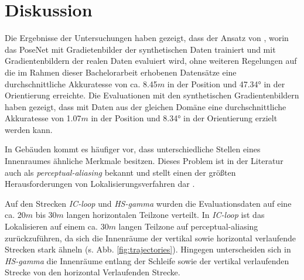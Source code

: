 
\section{Diskussion}
\label{sec:kapitel_5}

Die Ergebnisse der Untersuchungen haben gezeigt, dass der Ansatz von \citet{acharyaBIMPoseNetIndoorCamera2019}, worin das PoseNet mit Gradietenbilder der synthetischen Daten trainiert und mit Gradientenbildern der realen Daten evaluiert wird, ohne weiteren Regelungen auf die im Rahmen dieser Bachelorarbeit erhobenen Datensätze eine durchschnittliche Akkuratesse von ca. 8.45$m$ in der Position und 47.34° in der Orientierung erreichte. Die Evaluationen mit den synthetischen Gradientenbildern haben gezeigt, dass mit Daten aus der gleichen Domäne eine durchschnittliche Akkuratesse von 1.07$m$ in der Position und 8.34° in der Orientierung erzielt werden kann. 


In Gebäuden kommt es häufiger vor, dass unterschiedliche Stellen eines Innenraumes ähnliche Merkmale besitzen. Dieses Problem ist in der Literatur auch als \textit{perceptual-aliasing} bekannt und stellt einen der größten Herausforderungen von Lokalisierungsverfahren dar \cite{lowryVisualPlaceRecognition2016}.

Auf den Strecken \textit{IC-loop} und \textit{HS-gamma} wurden die Evaluationsdaten auf eine ca. 20$m$ bis 30$m$ langen horizontalen Teilzone verteilt. In \textit{IC-loop} ist das Lokalisieren auf einem ca. 30$m$ langen Teilzone auf perceptual-aliasing zurückzuführen, da sich die Innenräume der vertikal sowie horizontal verlaufende Strecken stark ähneln (s. Abb. \ref{fig:trajectories}). Hingegen unterscheiden sich in \textit{HS-gamma} die Innenräume entlang der Schleife sowie der vertikal verlaufenden Strecke von den horizontal Verlaufenden Strecke.


%



% 




